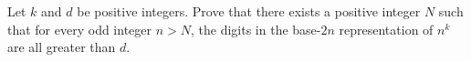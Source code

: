 Let $k$ and $d$ be positive integers. Prove that there exists a positive integer $N$ such that for every odd integer $n>N$, the digits in the base-$2n$ representation of $n^k$ are all greater than $d$.
